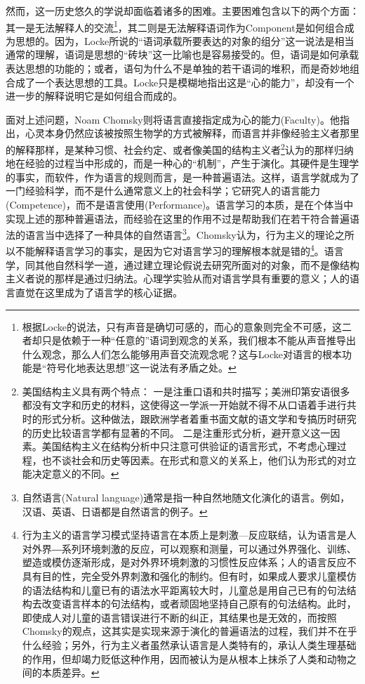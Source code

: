 \documentclass{article}
\begin{document}
然而，这一历史悠久的学说却面临着诸多的困难。主要困难包含以下的两个方面：其一是无法解释人的交流\footnote{根据Locke的说法，只有声音是确切可感的，而心的意象则完全不可感，这二者却只是依赖于一种“任意的”语词到观念的关系，我们根本不能从声音推导出什么观念，那么人们怎么能够用声音交流观念呢？这与Locke对语言的根本功能是“符号化地表达思想”这一说法有矛盾之处。}，其二则是无法解释语词作为Component是如何组合成为思想的。因为，Locke所说的“语词承载所要表达的对象的组分”这一说法是相当通常的理解，语词是思想的“砖块”这一比喻也是容易接受的。但，语词是如何承载表达思想的功能的；或者，语句为什么不是单独的若干语词的堆积，而是奇妙地组合成了一个表达思想的工具。Locke只是模糊地指出这是“心的能力”，却没有一个进一步的解释说明它是如何组合而成的。

面对上述问题，Noam Chomsky则将语言直接指定成为心的能力(Faculty)。他指出，心灵本身仍然应该被按照生物学的方式被解释，而语言并非像经验主义者那里的解释那样，是某种习惯、社会约定、或者像美国的结构主义者\footnote{美国结构主义具有两个特点：
一是注重口语和共时描写；美洲印第安语很多都没有文字和历史的材料，这使得这一学派一开始就不得不从口语着手进行共时的形式分析。这种做法，跟欧洲学者着重书面文献的语文学和专搞历时研究的历史比较语言学都有显著的不同。
二是注重形式分析，避开意义这一因素。美国结构主义在结构分析中只注意可供验证的语言形式，不考虑心理过程，也不谈社会和历史等因素。在形式和意义的关系上，他们认为形式的对立能决定意义的不同。}认为的那样归纳地在经验的过程当中形成的，而是一种心的“机制”，产生于演化。其硬件是生理学的事实，而软件，作为语言的规则而言，是一种{\heiti 普遍语法}。这样，语言学就成为了一门经验科学，而不是什么通常意义上的社会科学；它研究人的语言能力(Competence)，而不是语言使用(Performance)。语言学习的本质，是在个体当中实现上述的那种普遍语法，而经验在这里的作用不过是帮助我们在若干符合普遍语法的语言当中选择了一种具体的自然语言\footnote{自然语言(Natural language)通常是指一种自然地随文化演化的语言。例如，汉语、英语、日语都是自然语言的例子。}。Chomsky认为，行为主义的理论之所以不能解释语言学习的事实，是因为它对语言学习的理解根本就是错的\footnote{行为主义的语言学习模式坚持语言在本质上是刺激—反应联结，认为语言是人对外界―系列环境刺激的反应，可以观察和测量，可以通过外界强化、训练、塑造或模仿逐渐形成，是对外界环境刺激的习惯性反应体系；人的语言反应不具有目的性，完全受外界刺激和强化的制约。但有时，如果成人要求儿童模仿的语法结构和儿童已有的语法水平距离较大时，儿童总是用自己已有的句法结构去改变语言样本的句法结构，或者顽固地坚持自己原有的句法结构。此时，即使成人对儿童的语言错误进行不断的纠正，其结果也是无效的，而按照Chomsky的观点，这其实是实现来源于演化的普遍语法的过程，我们并不在乎什么经验；另外，行为主义者虽然承认语言是人类特有的，承认人类生理基础的作用，但却竭力贬低这种作用，因而被认为是从根本上抹杀了人类和动物之间的本质差异。}。语言学，同其他自然科学一道，通过建立理论假说去研究所面对的对象，而不是像结构主义者说的那样是通过归纳法。心理学实验从而对语言学具有重要的意义；人的语言直觉在这里成为了语言学的核心证据。
\end{document}
